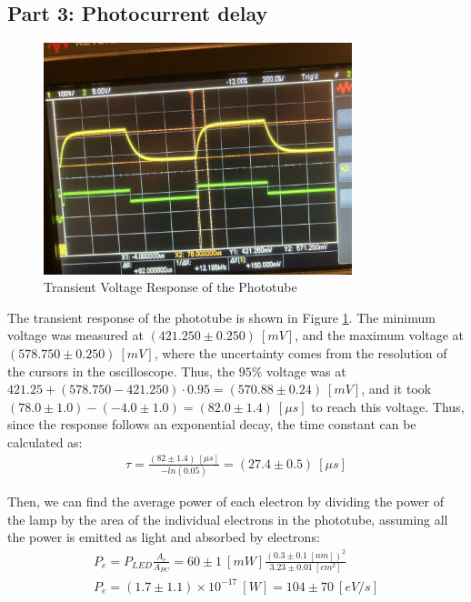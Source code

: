 \subsection{Part 3: Photocurrent delay}

\begin{figure}
    \centering
    \includegraphics[width=0.8\textwidth]{Results/Part3/V_Func.jpg}
    \caption{Transient Voltage Response of the Phototube}
    \label{fig:V_Func}
\end{figure}

The transient response of the phototube is shown in Figure \ref{fig:V_Func}. The minimum voltage was measured at $(421.250 \pm 0.250)~[mV]$, and the maximum voltage at $(578.750 \pm 0.250)~[mV]$, where the uncertainty comes from the resolution of the cursors in the oscilloscope. Thus, the $95\%$ voltage was at $421.25 + (578.750-421.250) \cdot 0.95 = (570.88 \pm 0.24)~[mV]$, and it took $(78.0 \pm 1.0) - (-4.0 \pm 1.0) = (82.0 \pm 1.4)~[\mu s]$ to reach this voltage. Thus, since the response follows an exponential decay, the time constant can be calculated as:
\begin{gather*}
    \tau = \frac{(82 \pm 1.4)~[\mu s]}{-ln(0.05)} = (27.4 \pm 0.5)~[\mu s]
\end{gather*}

Then, we can find the average power of each electron by dividing the power of the lamp by the area of the individual electrons in the phototube, assuming all the power is emitted as light and absorbed by electrons:
\begin{gather*}
    P_e = P_{LED} \frac {A_e}{A_{PC}} = 60\pm1~[mW] \frac{(0.3 \pm 0.1~[nm])^2}{3.23\pm 0.01~[cm^2]} \\
    P_e = (1.7 \pm 1.1) \times 10^{-17}~[W] = 104 \pm 70~[eV/s]
\end{gather*}

